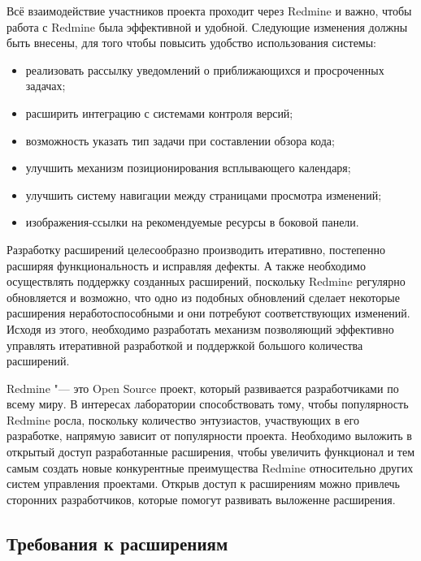    
Всё взаимодействие участников проекта проходит через Redmine и важно, чтобы
работа с Redmine была эффективной и удобной. Следующие изменения должны быть
внесены, для того чтобы повысить удобство использования системы:
\begin{itemize}
  \item реализовать рассылку уведомлений о приближающихся и просроченных
  задачах;
  \item расширить интеграцию с системами контроля версий; 
  \item возможность указать тип задачи при составлении обзора кода;
  \item улучшить механизм позиционирования всплывающего календаря;
  \item улучшить систему навигации между страницами просмотра изменений;
  \item изображения-ссылки на рекомендуемые ресурсы в боковой панели.
\end{itemize}

Разработку расширений целесообразно производить итеративно, постепенно расширяя
функциональность и исправляя дефекты. А также необходимо осуществлять поддержку
созданных расширений, поскольку Redmine регулярно обновляется и возможно, что
одно из подобных обновлений сделает некоторые расширения неработоспособными и
они потребуют соответствующих изменений. Исходя из этого, необходимо
разработать механизм позволяющий эффективно управлять итеративной разработкой и
поддержкой большого количества расширений.

Redmine "--- это Open Source проект, который развивается разработчиками по
всему миру. В интересах лаборатории способствовать тому, чтобы популярность
Redmine росла, поскольку количество энтузиастов, участвующих в его разработке,
напрямую зависит от популярности проекта. Необходимо выложить в открытый доступ
разработанные расширения, чтобы увеличить функционал и тем самым создать
новые конкурентные преимущества Redmine относительно других систем управления
проектами. Открыв доступ к расширениям можно привлечь сторонних
разработчиков, которые помогут развивать выложенне расширения.

\subsection{Требования к расширениям}
